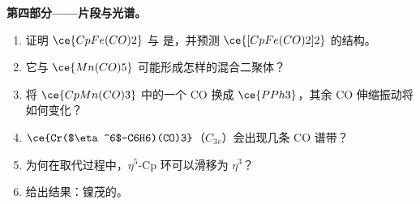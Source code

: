 \begin{problem}
\medskip\noindent\textbf{第四部分——片段与光谱。}
\begin{enumerate}[resume]
  \item 证明 $\ce{CpFe(CO)2}$ 与  是，并预测
        $\ce{[CpFe(CO)2]2}$ 的结构。
  \item 它与 $\ce{Mn(CO)5}$ 可能形成怎样的混合二聚体？
  \item 将 $\ce{CpMn(CO)3}$ 中的一个 CO 换成 $\ce{PPh3}$，其余
        CO 伸缩振动将如何变化？
  \item $\ce{Cr($\eta^6$-C6H6)(CO)3}$（$C_{3v}$）会出现几条 CO 谱带？
  \item 为何在取代过程中，$\eta^5$-Cp 环可以滑移为 $\eta^3$？
  \item 给出结果：镍茂的。
\end{enumerate}
\end{problem}
